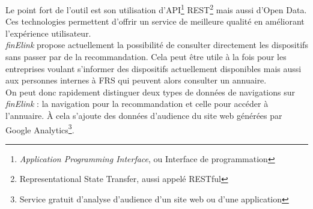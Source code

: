 Le point fort de l'outil est son utilisation d'API\footnote{\textit{Application Programming Interface}, ou Interface de programmation} REST\footnote{Representational State Transfer, aussi appelé RESTful} mais aussi d'Open Data. Ces technologies permettent d'offrir un service de meilleure qualité en améliorant l'expérience utilisateur.\\

\textit{finElink} propose actuellement la possibilité de consulter directement les dispositifs sans passer par de la recommandation. Cela peut être utile à la fois pour les entreprises voulant s'informer des dispositifs actuellement disponibles mais aussi aux personnes internes à FRS qui peuvent alors consulter un annuaire.\\

On peut donc rapidement distinguer deux types de données de navigations sur \textit{finElink} : la navigation pour la recommandation et celle pour accéder à l'annuaire. À cela s'ajoute des données d'audience du site web générées par Google Analytics\footnote{Service gratuit d'analyse d'audience d'un site web ou d'une application}.\\